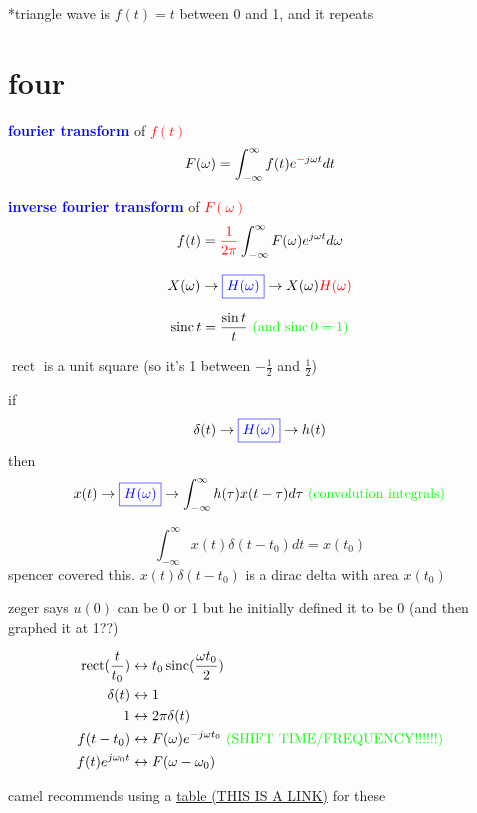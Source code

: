 \documentclass[a5paper, fleqn]{article}
\newcommand{\vocab}[1]{\textbf{\textcolor{blue}{#1}}}
\newcommand{\emf}[1]{\textcolor{red}{#1}}
\newcommand{\note}[1]{\textcolor{green}{#1}}
\newcommand{\eq}[1]{\textcolor{red}{$#1$}}
\DeclareMathOperator{\sinc}{sinc}
\DeclareMathOperator{\rect}{rect}
\begin{document}
*triangle wave is $f(t) = t$ between 0 and 1, and it repeats

\section*{\textcolor{primary}{four}}

\vocab{fourier transform} of \eq{f(t)}
\[F(\omega) = \int_{-\infty}^\infty f(t) e^{\emf{-}j\omega t} dt\]

\vocab{inverse fourier transform} of \eq{F(\omega)}
\[f(t) = \emf{\frac{1}{2\pi}} \int_{-\infty}^\infty F(\omega) e^{j\omega t} d\omega\]

\[X(\omega) \to \vocab{$\boxed{H(\omega)}$} \to X(\omega) \emf{H(\omega)}\]

\[\sinc t = \frac{\sin t}{t} ~ \note{\text{(and $\sinc 0 = 1$)}}\]

$\rect$ is a unit square (so it's 1 between $-\frac{1}{2}$ and $\frac{1}{2}$)

if
\[\delta(t) \to \vocab{$\boxed{H(\omega)}$} \to h(t)\]
then
\[x(t) \to \vocab{$\boxed{H(\omega)}$} \to \int_{-\infty}^\infty h(\tau) x(t - \tau) d\tau ~ \note{\text{(convolution integrals)}}\]

\[\int_{-\infty}^\infty x(t) \delta(t - t_0) dt = x(t_0)\]
spencer covered this. $x(t) \delta(t - t_0)$ is a dirac delta with area $x(t_0)$

zeger says $u(0)$ can be 0 or 1 but he initially defined it to be 0 (and then graphed it at 1??)

\begin{align*}
  \rect(\frac{t}{t_0})  & \leftrightarrow t_0 \sinc(\frac{\omega t_0}{2})                                         \\
  \delta(t)             & \leftrightarrow 1                                                                       \\
  1                     & \leftrightarrow 2 \pi \delta(t)                                                         \\
  f(t - t_0)            & \leftrightarrow F(\omega) e^{-j\omega t_0} ~ \text{\note{(SHIFT TIME/FREQUENCY!!!!!!)}} \\
  f(t) e^{j \omega_0 t} & \leftrightarrow F(\omega - \omega_0)
\end{align*}

camel recommends using a \href{https://ethz.ch/content/dam/ethz/special-interest/baug/ibk/structural-mechanics-dam/education/identmeth/fourier.pdf}{table (THIS IS A LINK)} for these
\end{document}

